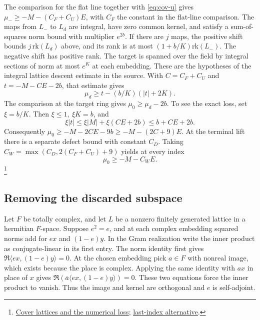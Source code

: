 The comparison for the flat line together with \eqref{eq:cov-u}
gives \(\mu_-\ge-M-(C_F+C_U)E\), with \(C_F\) the constant in the
flat-line comparison. The maps from \(L_-\) to \(L_d\) are integral,
have zero common kernel, and satisfy a sum-of-squares norm bound
with multiplier \(e^{2b}\). If there are \(j\) maps, the positive
shift bounds \(j\,\mathrm{rk}(L_d)\) above, and its rank is at most
\((1+b/K)\mathrm{rk}(L_-)\). The negative shift has positive rank.
The target is spanned over the field by integral sections of norm
at most \(e^K\) at each embedding. These are the hypotheses of the
integral lattice descent estimate in the source. With \(C=C_F+C_U\)
and \(t=-M-CE-2b\), that estimate gives
\[
                   \mu_d\ge t-(b/K)(|t|+2K).
\]
The comparison at the target ring gives \(\mu_0\ge\mu_d-2b\).
To see the exact loss, set \(\xi=b/K\). Then
\(\xi\le1,\ \xi K=b\), and
\[
 \xi |t|\le \xi|M|+\xi(CE+2b)\le b+CE+2b .
\]
Consequently \(\mu_0\ge-M-2CE-9b\ge-M-(2C+9)E\).
At the terminal lift there is a separate defect bound with constant
\(C_D\). Taking \(C_W=\max(C_D,2(C_F+C_U)+9)\) yields at every index
\begin{equation}                 \mu_0\ge-M-C_WE .\label{eq:cov-low}\end{equation}
\footnote{\href{https://github.com/Deicyde/riemann-hypothesis/blob/40e56bab/src/Development/AbelianVarietyTheory/Proofs/DivisorProofs/LowerBoundOfAllEstimates.lean}{Cover lattices and the numerical loss};
\href{https://github.com/Deicyde/riemann-hypothesis/blob/40e56bab/src/Development/AutomorphicArithmetic/ThetaCorrespondence/ThetaPairLifts/ThirdPlaceSeries/LowOfCoverHypotheses.lean}{last-index alternative}.}

\subsection{Removing the discarded subspace}
Let \(F\) be totally complex, and let \(L\) be a nonzero finitely
generated lattice in a hermitian \(F\)-space. Suppose \(e^2=e\), and at
each complex embedding squared norms add for \(ex\) and \((1-e)y\).
In the Gram realization write the inner product as conjugate-linear in
its first entry. The norm identity first gives
\(\Re\langle ex,(1-e)y\rangle=0\). At the chosen embedding pick
\(a\in F\) with nonreal image, which exists because the place is complex.
Applying the same identity with \(ax\) in place of \(x\) gives
\(\Re(\overline{a}\langle ex,(1-e)y\rangle)=0\). These two equations
force the inner product to vanish. Thus the image and kernel are
orthogonal and \(e\) is self-adjoint.

